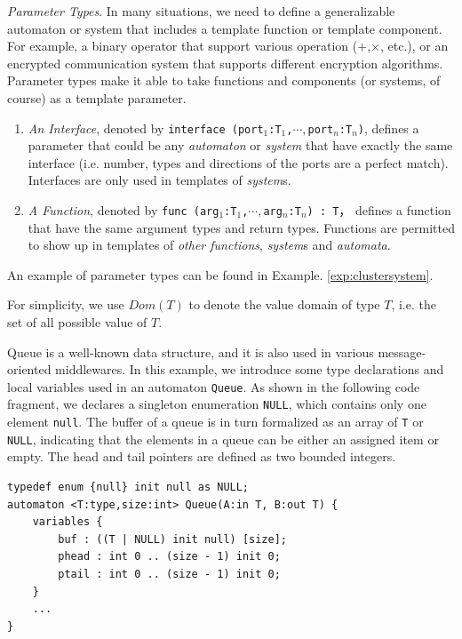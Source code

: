 \noindent\emph{Parameter Types}. In many situations, we need to define a generalizable automaton or system that includes a template function or template component. For example, a binary operator that support various operation ($+$,$\times$, etc.), or an encrypted communication system that supports different encryption algorithms. Parameter types make it able to take functions and components (or systems, of course) as a template parameter. 
\begin{enumerate}
    \item \emph{An Interface}, denoted by \texttt{interface (port$_1$:T$_1$,$\cdots,$port$_n$:T$_n$)}, defines a parameter that could be any \emph{automaton} or \emph{system} that have exactly the same interface (i.e. number, types and directions of the ports are a perfect match). Interfaces are only used in templates of \emph{system}s.
    \item \emph{A Function}, denoted by \texttt{func (arg$_1$:T$_1$,$\cdots, $arg$_n$:T$_n$) : T}， defines a function that have the same argument types and return types. Functions are permitted to show up in templates of \emph{other functions}, \emph{system}s and \emph{automata}.
\end{enumerate}
An example of parameter types can be found in Example. \ref{exp:clustersystem}.

For simplicity, we use $Dom(T)$ to denote the value domain of type $T$, i.e. the set of all possible value of $T$.

\begin{example} Queue is a well-known data structure, and it is also used in various message-oriented middlewares. In this example, we introduce some type declarations and local variables used in an automaton \texttt{Queue}. As shown in the following code fragment, we declares a singleton enumeration \texttt{NULL}, which contains only one element \texttt{null}. The buffer of a queue is in turn formalized as an array of \texttt{T} or \texttt{NULL}, indicating that the elements in a queue can be either an assigned item or empty. The head and tail pointers are defined as two bounded integers.
\begin{lstlisting}
typedef enum {null} init null as NULL;
automaton <T:type,size:int> Queue(A:in T, B:out T) {
    variables {
        buf : ((T | NULL) init null) [size];
        phead : int 0 .. (size - 1) init 0;
        ptail : int 0 .. (size - 1) init 0;
    }
    ...
}
\end{lstlisting}
\label{exp:typeinqueue}
\end{example}

